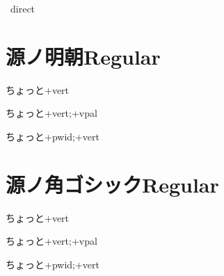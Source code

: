 \documentclass[tate,paper={297mm,210mm}]{jlreq}
\begin{document}
\hgrnone\hbox{\tate\vrule%
  \vrule direct}

\section*{源ノ明朝Regular}

\sernone\hbox{\tate\vrule ちょっと\vrule +vert}

\servpal\hbox{\tate\vrule ちょっと\vrule +vert;+vpal}

\serpwidvert\hbox{\tate\vrule ちょっと\vrule +pwid;+vert}

\section*{源ノ角ゴシックRegular}

\sarnone\hbox{\tate\vrule ちょっと\vrule +vert}

\sarvpal\hbox{\tate\vrule ちょっと\vrule +vert;+vpal}

\sarpwidvert\hbox{\tate\vrule ちょっと\vrule +pwid;+vert}
\end{document}
